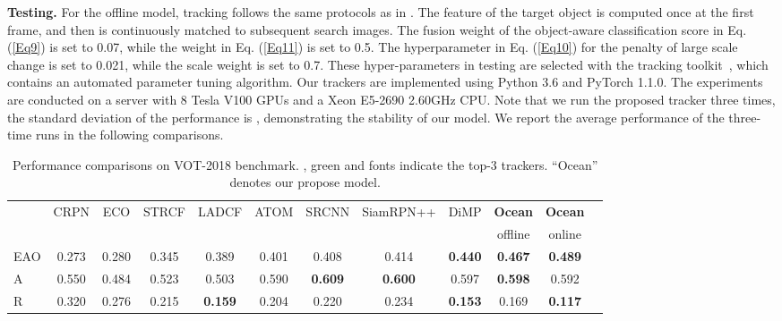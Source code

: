 \documentclass[runningheads]{llncs}
\begin{document}
\textbf{Testing.} For the offline model, tracking follows the same protocols as in \cite{siamFC,siamRPN}. The feature of the target object is computed once at the first frame, and then is continuously matched to subsequent search images. The fusion weight  of the object-aware classification score in Eq. (\ref{Eq9}) is set to 0.07, while the weight  in Eq. (\ref{Eq11}) is set to 0.5. The hyperparameter  in Eq. (\ref{Eq10}) for the penalty of large scale change is set to 0.021, while the scale weight  is set to 0.7. These hyper-parameters in testing are selected with the tracking toolkit~\cite{SiamDW}, which contains an automated parameter tuning algorithm. 
Our trackers are implemented using Python 3.6 and PyTorch 1.1.0. The experiments are conducted on a server with 8 Tesla V100 GPUs and a Xeon E5-2690 2.60GHz CPU. Note that we run the proposed tracker three times, the standard deviation of the performance is , demonstrating the stability of our model. We report the average performance of the three-time runs in the following comparisons.

\setlength{\tabcolsep}{.2em}

\begin{table*}[!t] \scriptsize
		\vspace{-0.6em}
	\centering
	\begin{tabular}{l| c c c c c c c c c c c}
		& CRPN &ECO & STRCF& LADCF & ATOM &SRCNN& SiamRPN++  & DiMP & \textbf{Ocean} & \textbf{Ocean}\\ & \cite{CRPN} & \cite{ECO}  & \cite{STRCF}  & \cite{LADCF} & \cite{ATOM} & \cite{SiamRCNN} &\cite{SiamRPN++} & \cite{DiMP} & offline & online\\
		
		\shline EAO   & 0.273 &0.280  & 0.345 & 0.389 & 0.401 & 0.408 & 0.414 & \color{blue}\textbf{0.440} & \color{green}\textbf{0.467} & \color{red}\textbf{0.489} \\ A   & 0.550 & 0.484& 0.523 & 0.503 & 0.590 & \color{red}\textbf{0.609} & \color{green}\textbf{0.600} & 0.597  & \color{blue}\textbf{0.598} & 0.592\\ R   & 0.320 &0.276 &0.215 & \color{green}\textbf{0.159} & 0.204& 0.220 & 0.234 & \color{blue}\textbf{0.153} & 0.169 & \color{red}\textbf{0.117}\\ 

	\end{tabular}
	




	\caption{Performance comparisons on VOT-2018 benchmark. {\color{red}{Red}}, {\color{green}green} and {\color{blue}{blue}} fonts indicate the top-3 trackers. ``Ocean'' denotes our propose model.} 
	\label{VOT18TAB}
	\vspace{-2em}
\end{table*}
\end{document}
